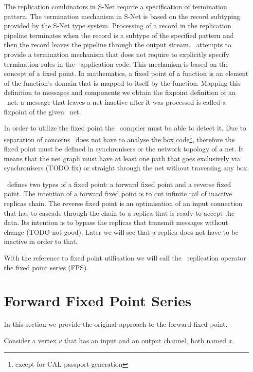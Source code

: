 The replication combinators in S-Net require a specification of termination pattern. The termination mechanism in S-Net is based on the record subtyping provided by the S-Net type system. Processing of a record in the replication pipeline terminates when the record is a subtype of the specified pattern and then the record leaves the pipeline through the output stream. \ak\ attempts to provide a termination mechanism that does not require to explicitly specify termination rules in the \ak\ application code. This mechanism is based on the concept of a fixed point. In mathematics, a fixed point of a function is an element of the function's domain that is mapped to itself by the function. Mapping this definition to messages and components we obtain the fixpoint definition of an \ak\ net: a message that leaves a net inactive after it was processed is called a fixpoint of the given \ak\ net.

In order to utilize the fixed point the \ak\ compiler must be able to detect it. Due to separation of concerns \ak\ does not have to analyse the box code\footnote{except for CAL passport generation}, therefore the fixed point must be defined in synchronisers or the network topology of a net. It means that the net graph must have at least one path that goes exclusively via synchronisers (TODO fix) or straight through the net without traversing any box.

\ak\ defines two types of a fixed point: a forward fixed point and a reverse fixed point. The intention of a forward fixed point is to cut infinite tail of inactive replicas chain. The reverse fixed point is an optimisation of an input connection that has to cascade through the chain to a replica that is ready to accept the data. Its intention is to bypass the replicas that transmit messages without change (TODO not good). Later we will see that a replica does not have to be inactive in order to that.

With the reference to fixed point utilisation we will call the \ak\ replication operator the fixed point series (FPS).



    \section{Forward Fixed Point Series\label{ffp}}
In this section we provide the original approach to the forward fixed point.


Consider a vertex $v$ that has an input and an output channel, both named $x$.

